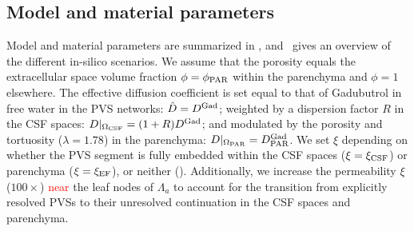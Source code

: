 \documentclass[fleqn,10pt]{wlscirep}
\newcommand{\fixme}[1]{\textcolor{red}{#1}}
\begin{document}
\subsection*{Model and material parameters}

Model and material parameters are summarized in ,
and~ gives an overview of the different in-silico
scenarios. We assume that the porosity equals the extracellular space
volume fraction $\phi = \phi_{\rm PAR}$ within the parenchyma and
$\phi = 1$ elsewhere. The effective diffusion coefficient is set equal
to that of Gadubutrol in free water in the PVS networks: $\hat{D} =
D^{\rm Gad}$; weighted by a dispersion factor $R$ in the CSF spaces:
$D|_{\Omega_{\rm CSF}} = ( 1 + R) D^{\rm Gad}$; and modulated by the
porosity and tortuosity ($\lambda = 1.78$) in the parenchyma:
$D|_{\Omega_{\rm PAR}} = D^{\rm Gad}_{\rm PAR}$. We set $\xi$
depending on whether the PVS segment is fully embedded within the CSF
spaces ($\xi = \xi_{\rm CSF}$) or parenchyma ($\xi = \xi_{\rm EF}$),
or neither (). Additionally, we increase the
permeability $\xi$ ($100\times$) \fixme{near} the leaf nodes of
$\Lambda_a$ to account for the transition from explicitly resolved
PVSs to their unresolved continuation in the CSF spaces and
parenchyma.
\end{document}
